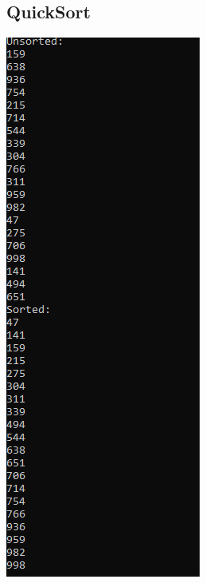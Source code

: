\documentclass{article}
\begin{document}
    \subsection{QuickSort}
    \includegraphics[]{quickSort.png}
\end{document}
